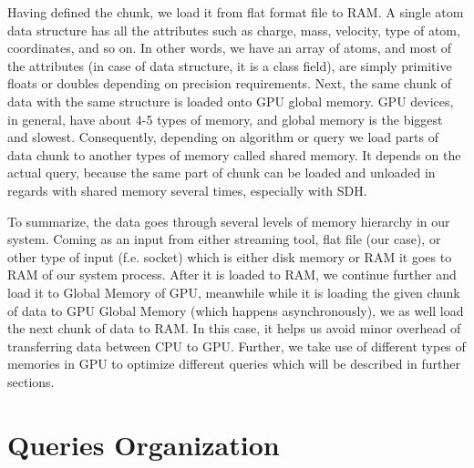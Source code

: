 \documentclass[12pt,letterpaper]{report}
\begin{document}
\noindent\hspace{3em}Having defined the chunk, we load it from flat format file to RAM. A single atom data structure has all the attributes such as charge, mass, velocity, type of atom, coordinates, and so on. In other words, we have an array of atoms, and most of the attributes (in case of data structure, it is a class field), are simply primitive floats or doubles depending on precision requirements. Next, the same chunk of data with the same structure is loaded onto GPU global memory. GPU devices, in general, have about 4-5 types of memory, and global memory is the biggest and slowest. Consequently, depending on algorithm or query we load parts of data chunk to another types of memory called shared memory. It depends on the actual query, because the same part of chunk can be loaded and unloaded in regards with shared memory several times, especially with SDH.

\noindent\hspace{3em}To summarize, the data goes through several levels of memory hierarchy in our system. Coming as an input from either streaming tool, flat file (our case), or other type of input (f.e. socket) which is either disk memory or RAM it goes to RAM of our system process. After it is loaded to RAM, we continue further and load it to Global Memory of GPU, meanwhile while it is loading the given chunk of data to GPU Global Memory (which happens asynchronously), we as well load the next chunk of data to RAM. In this case, it helps us avoid minor overhead of transferring data between CPU to GPU. Further, we take use of different types of memories in GPU to optimize different queries which will be described in further sections.

\section{Queries Organization}
\end{document}
